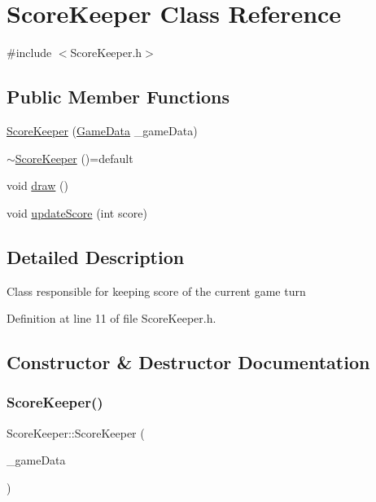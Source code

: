 \hypertarget{class_score_keeper}{}\section{Score\+Keeper Class Reference}
\label{class_score_keeper}


{\ttfamily \#include $<$Score\+Keeper.\+h$>$}

\subsection*{Public Member Functions}
\begin{DoxyCompactItemize}
\item 
\mbox{\hyperlink{class_score_keeper_ab3478ac9c94af3b750ae5ff1c45fd2da}{Score\+Keeper}} (\mbox{\hyperlink{_engine_8h_a5bbe002e9f7f45a67e8fda9dbe980a3f}{Game\+Data}} \+\_\+game\+Data)
\item 
\mbox{\hyperlink{class_score_keeper_a9c7e1807d09a538f5f806724e52d72e0}{$\sim$\+Score\+Keeper}} ()=default
\item 
void \mbox{\hyperlink{class_score_keeper_aa51b77d01ac44caa656b9f2ad474765d}{draw}} ()
\item 
void \mbox{\hyperlink{class_score_keeper_a5860a6708f7c544ea9dbe222a397ad2c}{update\+Score}} (int score)
\end{DoxyCompactItemize}


\subsection{Detailed Description}
Class responsible for keeping score of the current game turn 

Definition at line 11 of file Score\+Keeper.\+h.



\subsection{Constructor \& Destructor Documentation}
\mbox{\label{class_score_keeper_ab3478ac9c94af3b750ae5ff1c45fd2da}} 
\subsubsection{\texorpdfstring{ScoreKeeper()}{ScoreKeeper()}}
{\footnotesize\ttfamily Score\+Keeper\+::\+Score\+Keeper (\begin{DoxyParamCaption}\item[{\mbox{\hyperlink{_engine_8h_a5bbe002e9f7f45a67e8fda9dbe980a3f}{Game\+Data}}}]{\+\_\+game\+Data }\end{DoxyParamCaption})\hspace{0.3cm}{\ttfamily [explicit]}}

